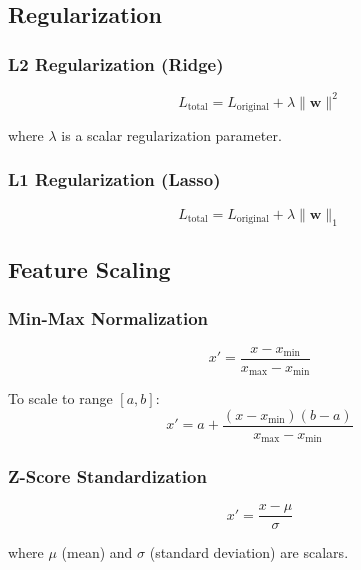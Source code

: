 \documentclass[11pt,a4paper]{article}
\begin{document}
\subsection{Regularization}

\subsubsection{L2 Regularization (Ridge)}

\begin{equation}
    L_{\text{total}} = L_{\text{original}} + \lambda \|\mathbf{w}\|^2
\end{equation}

where $\lambda$ is a scalar regularization parameter.

\subsubsection{L1 Regularization (Lasso)}

\begin{equation}
    L_{\text{total}} = L_{\text{original}} + \lambda \|\mathbf{w}\|_1
\end{equation}

\subsection{Feature Scaling}

\subsubsection{Min-Max Normalization}

\begin{equation}
    x' = \frac{x - x_{\min}}{x_{\max} - x_{\min}}
\end{equation}

To scale to range $[a, b]$:
\begin{equation}
    x' = a + \frac{(x - x_{\min})(b - a)}{x_{\max} - x_{\min}}
\end{equation}

\subsubsection{Z-Score Standardization}

\begin{equation}
    x' = \frac{x - \mu}{\sigma}
\end{equation}

where $\mu$ (mean) and $\sigma$ (standard deviation) are scalars.
\end{document}
